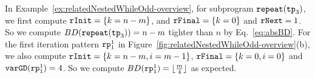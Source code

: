 In Example~\ref{ex:relatedNestedWhileOdd-overview}, for subprogram $\mathtt{repeat}(\mathtt{tp}_3)$, we first compute $\mathtt{rInit} = \{k = n - m\}$,
and $\mathtt{rFinal} = \{k = 0\}$ and $\mathtt{rNext} = 1$. So we compute $BD(\mathtt{repeat}(\mathtt{tp}_3)) = n - m$ tighter than $n$ by Eq.~\ref{eq:absBD}.
For the first iteration pattern $\mathtt{rp}_1^1$ in Figure~\ref{fig:relatedNestedWhileOdd-overview}(b), we also compute 
$\mathtt{rInit} = \{k = n - m, i = m - 1\}$, $\mathtt{rFinal} = \{k = 0, i = 0\}$ and $\mathtt{varGD}(\mathtt{rp}_1^1) = 4$. So we compute $BD(\mathtt{rp}_1^1) = \lfloor \frac{m}{4} \rfloor $ as expected.

